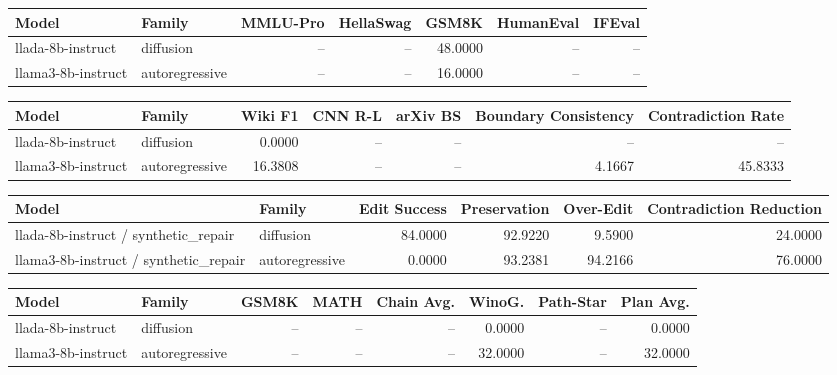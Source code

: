 \begin{tabular}{llrrrrr}
\toprule
Model & Family & MMLU-Pro & HellaSwag & GSM8K & HumanEval & IFEval \\
\midrule
llada-8b-instruct & diffusion & -- & -- & 48.0000 & -- & -- \\
llama3-8b-instruct & autoregressive & -- & -- & 16.0000 & -- & -- \\
\bottomrule
\end{tabular}

\begin{tabular}{llrrrrr}
\toprule
Model & Family & Wiki F1 & CNN R-L & arXiv BS & Boundary Consistency & Contradiction Rate \\
\midrule
llada-8b-instruct & diffusion & 0.0000 & -- & -- & -- & -- \\
llama3-8b-instruct & autoregressive & 16.3808 & -- & -- & 4.1667 & 45.8333 \\
\bottomrule
\end{tabular}

\begin{tabular}{llrrrr}
\toprule
Model & Family & Edit Success & Preservation & Over-Edit & Contradiction Reduction \\
\midrule
llada-8b-instruct / synthetic\_repair & diffusion & 84.0000 & 92.9220 & 9.5900 & 24.0000 \\
llama3-8b-instruct / synthetic\_repair & autoregressive & 0.0000 & 93.2381 & 94.2166 & 76.0000 \\
\bottomrule
\end{tabular}

\begin{tabular}{llrrrrrr}
\toprule
Model & Family & GSM8K & MATH & Chain Avg. & WinoG. & Path-Star & Plan Avg. \\
\midrule
llada-8b-instruct & diffusion & -- & -- & -- & 0.0000 & -- & 0.0000 \\
llama3-8b-instruct & autoregressive & -- & -- & -- & 32.0000 & -- & 32.0000 \\
\bottomrule
\end{tabular}

